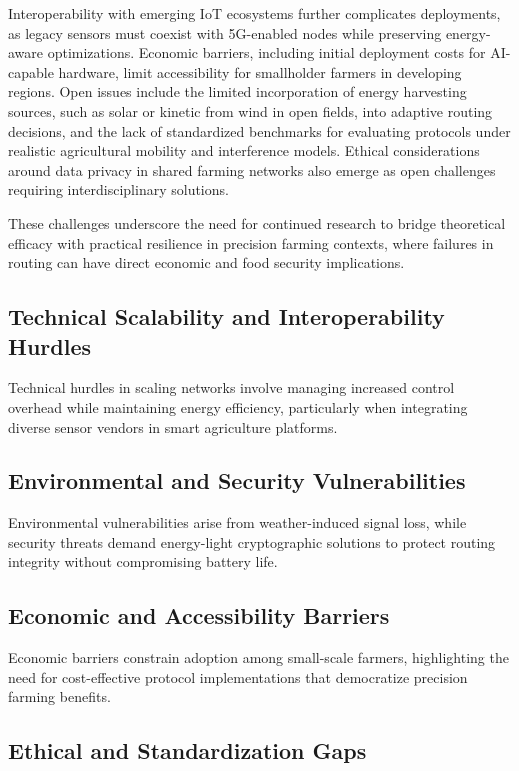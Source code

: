 \documentclass[12pt]{article}
\begin{document}
Interoperability with emerging IoT ecosystems further complicates deployments, as legacy sensors must coexist with 5G-enabled nodes while preserving energy-aware optimizations. Economic barriers, including initial deployment costs for AI-capable hardware, limit accessibility for smallholder farmers in developing regions. Open issues include the limited incorporation of energy harvesting sources, such as solar or kinetic from wind in open fields, into adaptive routing decisions, and the lack of standardized benchmarks for evaluating protocols under realistic agricultural mobility and interference models. Ethical considerations around data privacy in shared farming networks also emerge as open challenges requiring interdisciplinary solutions.

These challenges underscore the need for continued research to bridge theoretical efficacy with practical resilience in precision farming contexts, where failures in routing can have direct economic and food security implications.

\subsection{Technical Scalability and Interoperability Hurdles}

Technical hurdles in scaling networks involve managing increased control overhead while maintaining energy efficiency, particularly when integrating diverse sensor vendors in smart agriculture platforms.

\subsection{Environmental and Security Vulnerabilities}

Environmental vulnerabilities arise from weather-induced signal loss, while security threats demand energy-light cryptographic solutions to protect routing integrity without compromising battery life.

\subsection{Economic and Accessibility Barriers}

Economic barriers constrain adoption among small-scale farmers, highlighting the need for cost-effective protocol implementations that democratize precision farming benefits.

\subsection{Ethical and Standardization Gaps}
\end{document}
